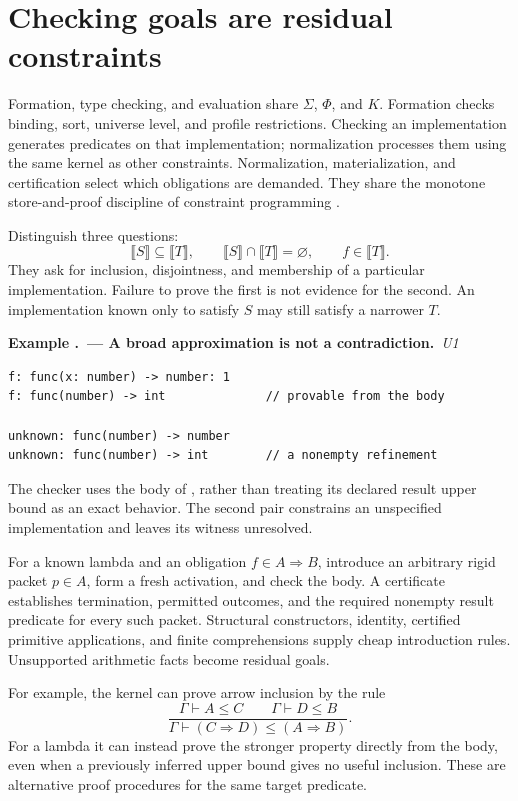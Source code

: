 \documentclass[11pt,a4paper,oneside]{report}
\newcommand{\code}[1]{\texttt{\detokenize{#1}}}
\newcommand{\sem}[1]{\llbracket #1\rrbracket}
\newcommand{\Uone}{\ensuremath{\profilecal{U}_{1}}}
\def\Uone{U1}%
\theoremstyle{remark}
\newcounter{example}[chapter]
\renewcommand{\theexample}{\thechapter.\arabic{example}}
\newcommand{\example}[2]{\refstepcounter{example}\Needspace{5\baselineskip}\par\textbf{Example \theexample\ --- #1.}\ \textit{#2}\par\nopagebreak[4]}
\begin{document}
\section{Checking goals are residual constraints}
Formation, type checking, and evaluation share $\Sigma$, $\Phi$, and $K$.
Formation checks binding, sort, universe level, and profile restrictions.
Checking an implementation generates predicates on that implementation;
normalization processes them using the same kernel as other constraints.
Normalization, materialization, and certification select which obligations are
demanded. They share the monotone store-and-proof discipline of constraint
programming \cite{ccp91}.

Distinguish three questions:
\[
 \sem S\subseteq\sem T,
 \qquad \sem S\cap\sem T=\varnothing,
 \qquad f\in\sem T.
\]
They ask for inclusion, disjointness, and membership of a particular
implementation. Failure to prove the first is not evidence for the second.
An implementation known only to satisfy $S$ may still satisfy a narrower $T$.

\example{A broad approximation is not a contradiction}{\Uone{}}
\par\noindent\begin{minipage}{\linewidth}
\begin{lstlisting}
f: func(x: number) -> number: 1
f: func(number) -> int              // provable from the body

unknown: func(number) -> number
unknown: func(number) -> int        // a nonempty refinement
\end{lstlisting}
\end{minipage}\par
The checker uses the body of \code{f}, rather than treating its declared result
upper bound as an exact behavior. The second pair constrains an unspecified
implementation and leaves its witness unresolved.

For a known lambda and an obligation $f\in A\Rightarrow B$, introduce an
arbitrary rigid packet $p\in A$, form a fresh activation, and check the body.
A certificate establishes termination, permitted outcomes, and the required
nonempty result predicate for every such packet. Structural constructors,
identity, certified primitive applications, and finite comprehensions supply
cheap introduction rules. Unsupported arithmetic facts become residual goals.

For example, the kernel can prove arrow inclusion by the rule
\[
 \frac{\Gamma\vdash A\le C\qquad\Gamma\vdash D\le B}
      {\Gamma\vdash(C\Rightarrow D)\le(A\Rightarrow B)}.
\]
For a lambda it can instead prove the stronger property directly from the body,
even when a previously inferred upper bound gives no useful inclusion.
These are alternative proof procedures for the same target predicate.
\end{document}
